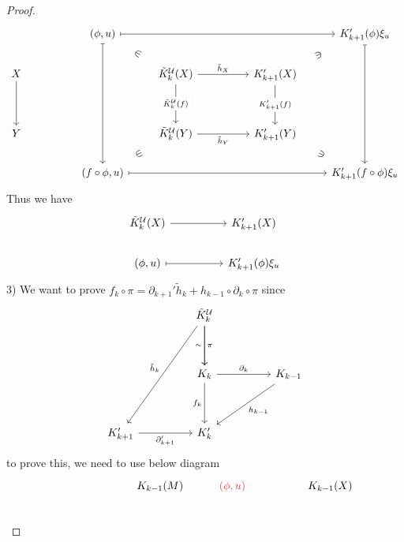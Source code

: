 \documentclass{article}
\begin{document}
\begin{proof}
    \[\begin{tikzcd}
        && {(\phi,u)} &&&& {K'_{k+1}(\phi)\xi_u} \\
        X &&& {\tilde{K}_k^\mathcal{U}(X)} && {K'_{k+1}(X)} \\
        \\
        Y &&& {\tilde{K}_k^\mathcal{U}(Y)} && {K'_{k+1}(Y)} \\
        && {(f\circ \phi,u)} &&&& {K'_{k+1}(f \circ \phi)\xi_u}
        \arrow[from=2-1, to=4-1]
        \arrow["\in"{marking}, draw=none, from=1-3, to=2-4]
        \arrow["\in"{marking}, draw=none, from=5-3, to=4-4]
        \arrow[maps to, from=1-3, to=5-3]
        \arrow["{\tilde{h}_X}", from=2-4, to=2-6]
        \arrow["{\tilde{h}_Y}"', from=4-4, to=4-6]
        \arrow["{\tilde{K}_k^\mathcal{U}(f)}"{description}, from=2-4, to=4-4]
        \arrow["{K'_{k+1}(f)}"{description}, from=2-6, to=4-6]
        \arrow["\ni"{marking}, draw=none, from=1-7, to=2-6]
        \arrow[maps to, from=1-7, to=5-7]
        \arrow["\ni"{marking}, draw=none, from=5-7, to=4-6]
        \arrow[maps to, from=1-3, to=1-7]
        \arrow[maps to, from=5-3, to=5-7]
    \end{tikzcd}\]
    Thus we have
    \[\begin{tikzcd}
        {\tilde{K}^\mathcal{U}_k(X)} && {K_{k+1}'(X)} \\
        {(\phi,u)} && {K_{k+1}'(\phi)\xi_u}
        \arrow[maps to, from=2-1, to=2-3]
        \arrow[from=1-1, to=1-3]
    \end{tikzcd}\]
    3) We want to prove $f_k\circ \pi = \partial_{k+1}'\tilde{h}_k + h_{k-1}\circ \partial_k\circ \pi$ since
    \[\begin{tikzcd}
        && {\tilde{K}_k^{\mathcal{U}}} \\
        \\
        && {K_k} && {K_{k-1}} \\
        \\
        {K'_{k+1}} && {K'_k}
        \arrow["{\tilde{h}_{k}}"', from=1-3, to=5-1]
        \arrow["\pi", from=1-3, to=3-3]
        \arrow["\sim"', from=1-3, to=3-3]
        \arrow["{f_k}"', from=3-3, to=5-3]
        \arrow["{\partial_{k+1}'}"', from=5-1, to=5-3]
        \arrow["{h_{k-1}}", from=3-5, to=5-3]
        \arrow["{\partial_k}", from=3-3, to=3-5]
    \end{tikzcd}\]
    to prove this, we need to use below diagram
    \[\begin{tikzcd}
        &&& {K_{k-1}(M)} & \textcolor{rgb,255:red,255;green,51;blue,51}{(\phi,u)} && {K_{k-1}(X)} \\

\end{tikzcd}\]
\end{proof}
\end{document}
